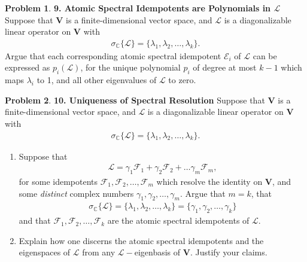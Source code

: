 \documentclass{article}
\theoremstyle{definition}
\newtheorem*{prob*}{Problem}
\newcommand{\F}{\mathcal{F}}
\newcommand{\V}{\mathbf{V}}
\newcommand{\lag}{\mathcal{L}}
\newcommand{\E}{\mathcal{E}}
\begin{document}
\newpage



\begin{prob*}\textbf{9. Atomic Spectral Idempotents are Polynomials in $\lag$}
	Suppose that $\V$ is a finite-dimensional vector space, and $\lag$ is a diagonalizable linear operator on $\V$ with
	\begin{align*}
	\sigma_{\mathbb{C}}\{ \lag\} = \{\lambda_1, \lambda_2,\dots,\lambda_k\}.
	\end{align*}
	Argue that each corresponding atomic spectral idempotent $\E_i$ of $\lag$ can be expressed as $p_i(\lag)$, for the unique polynomial $p_i$ of degree at most $k-1$ which maps $\lambda_i$ to 1, and all other eigenvalues of $\lag$ to zero. 
\end{prob*}





\newpage




\begin{prob*}\textbf{10. Uniqueness of Spectral Resolution}
	Suppose that $\V$ is a finite-dimensional vector space, and $\lag$ is a diagonalizable linear operator on $\V$ with 
	\begin{align*}
	\sigma_{\mathbb{C}}\{ \lag\} = \{\lambda_1, \lambda_2,\dots,\lambda_k\}.
	\end{align*}
	\begin{enumerate}
		\item Suppose that 
		\begin{align*}
		\lag = \gamma_1\F_1 + \gamma_2\F_2 + \dots \gamma_m\F_m,
		\end{align*}
		for some idempotents $\F_1,\F_2,\dots,\F_m$ which resolve the identity on $\V$, and some \textit{distinct} complex numbers $\gamma_1,\gamma_2,\dots,\gamma_m$. Argue that $m=k$, that
		\begin{align*}
		\sigma_{\mathbb{C}}\{ \lag\} = \{\lambda_1, \lambda_2,\dots,\lambda_k\} = \{\gamma_1, \gamma_2,\dots,\gamma_k\}
		\end{align*}
		and that $\F_1,\F_2,\dots,\F_k$ are the atomic spectral idempotents of $\lag$. 
		
		
		
		
		\item Explain how one discerns the atomic spectral idempotents and the eigenspaces of $\lag$ from any $\lag-$eigenbasis of $\V$. Justify your claims. 
	\end{enumerate}
	
\end{prob*}
\end{document}
